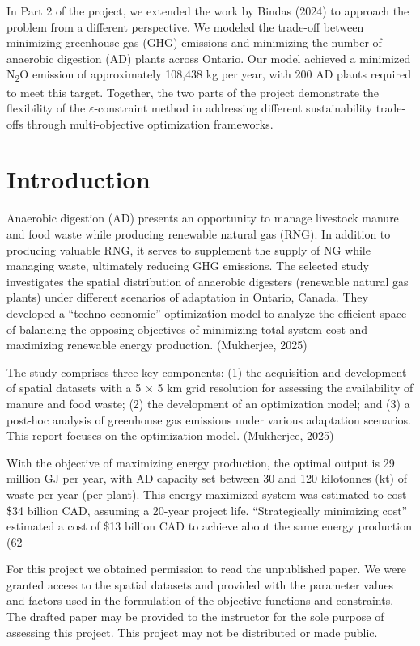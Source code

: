 \documentclass[12pt]{article}
\begin{document}
In Part 2 of the project, we extended the work by Bindas (2024) to approach the problem from a different perspective. We modeled the trade-off between minimizing greenhouse gas (GHG) emissions and minimizing the number of anaerobic digestion (AD) plants across Ontario. Our model achieved a minimized N\textsubscript{2}O emission of approximately 108,438 kg per year, with 200 AD plants required to meet this target. Together, the two parts of the project demonstrate the flexibility of the $\varepsilon$-constraint method in addressing different sustainability trade-offs through multi-objective optimization frameworks.


\section{Introduction}
Anaerobic digestion (AD) presents an opportunity to manage livestock manure and food waste while producing renewable natural gas (RNG). In addition to producing valuable RNG, it serves to supplement the supply of NG while managing waste, ultimately reducing GHG emissions. 
The selected study investigates the spatial distribution of anaerobic digesters (renewable natural gas plants) under different scenarios of adaptation in Ontario, Canada. They developed a “techno-economic” optimization model to analyze the efficient space of balancing the opposing objectives of minimizing total system cost and maximizing renewable energy production. (Mukherjee, 2025) 

The study comprises three key components: (1) the acquisition and development of spatial datasets with a 5 × 5 km grid resolution for assessing the availability of manure and food waste; (2) the development of an optimization model; and (3) a post-hoc analysis of greenhouse gas emissions under various adaptation scenarios. This report focuses on the optimization model. (Mukherjee, 2025) 

With the objective of maximizing energy production, the optimal output is 29 million GJ per year, with AD capacity set between 30 and 120 kilotonnes (kt) of waste per year (per plant). This energy-maximized system was estimated to cost \$34 billion CAD, assuming a 20-year project life. “Strategically minimizing cost” estimated a cost of \$13 billion CAD to achieve about the same energy production (62%

For this project we obtained permission to read the unpublished paper. We were granted access to the spatial datasets and provided with the parameter values and factors used in the formulation of the objective functions and constraints. The drafted paper may be provided to the instructor for the sole purpose of assessing this project. This project may not be distributed or made public.
\end{document}
